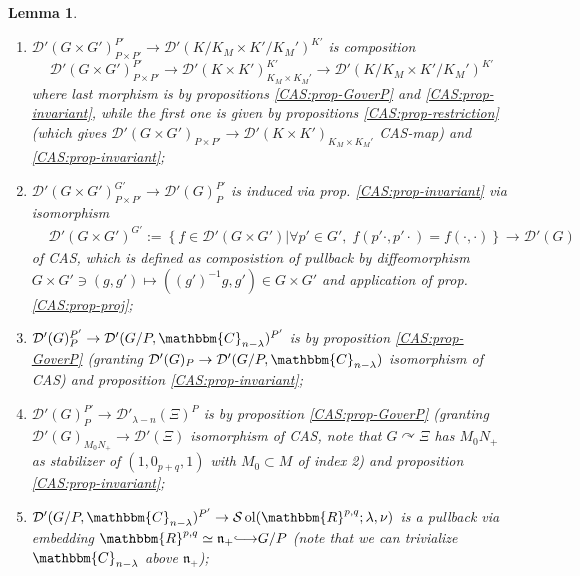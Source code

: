 \documentclass{article}
\newcommand{\assign}{:=}
\newcommand{\longhookrightarrow}{{\lhook\joinrel\relbar\joinrel\rightarrow}}
\newcommand{\tmop}[1]{\ensuremath{\operatorname{#1}}}
\newtheorem{lemma}{Lemma}
\begin{document}
\begin{lemma}
\begin{enumerate}
    \item $\mathcal{D}' (G \times G')_{P \times P'}^{P'} \rightarrow
    \mathcal{D}' (K / K_M \times K' / K_M')^{K'}$ is composition
    \[ \mathcal{D}' (G \times G')_{P \times P'}^{P'} \rightarrow \mathcal{D}'
       (K \times K')_{K_M \times K_M'}^{K'} \rightarrow \mathcal{D}' (K / K_M
       \times K' / K_M')^{K'} \]
    where last morphism is by propositions \ref{CAS:prop-GoverP} and
    \ref{CAS:prop-invariant}, while the first one is given by propositions
    \ref{CAS:prop-restriction} (which gives $\mathcal{D}' (G \times G')_{P
    \times P'} \rightarrow \mathcal{D}' (K \times K')_{K_M \times K_M'}$
    CAS-map) and \ref{CAS:prop-invariant};
    
    \item $\mathcal{D}' (G \times G')^{G'}_{P \times P'} \rightarrow
    \mathcal{D}' (G)_P^{P'}$ is induced via prop. \ref{CAS:prop-invariant} via
    isomorphism
    \begin{eqnarray}
      & \mathcal{D}' (G \times G')^{G'} \assign \left\{ f \in \mathcal{D}' (G
      \times G') \big| \forall p' \in G', \; f (p' \cdot, p' \cdot) = f
      (\cdot, \cdot) \right\} \rightarrow \mathcal{D}' (G) &  \nonumber
    \end{eqnarray}
    of CAS, which is defined as composistion of pullback by diffeomorphism $G
    \times G' \ni (g, g') \mapsto ((g')^{- 1} g, g') \in G \times G'$ and
    application of prop. \ref{CAS:prop-proj};
    
    \item $\mathcal{D}' (G)_P^{P'} \rightarrow \mathcal{D}' (G / P,
    \mathbbm{C}_{n - \lambda})^{P'}$ is by proposition \ref{CAS:prop-GoverP}
    (granting $\mathcal{D}' (G)_P \rightarrow \mathcal{D}' (G / P,
    \mathbbm{C}_{n - \lambda})$ isomorphism of CAS) and proposition
    \ref{CAS:prop-invariant};
    
    \item $\mathcal{D}' (G)_P^{P'} \rightarrow \mathcal{D}'_{\lambda - n}
    (\Xi)^P$ is by proposition \ref{CAS:prop-GoverP} (granting $\mathcal{D}'
    (G)_{M_0 N_+} \rightarrow \mathcal{D}' (\Xi)$ isomorphism of CAS, note
    that $G \curvearrowright \Xi$ has $M_0 N_+$ as stabilizer of $(1, 0_{p +
    q}, 1)$ with $M_0 \subset M$ of index 2) and proposition
    \ref{CAS:prop-invariant};
    
    \item $\mathcal{D}' (G / P, \mathbbm{C}_{n - \lambda})^{P'} \rightarrow
    \mathcal{S} \tmop{ol} (\mathbbm{R}^{p, q} ; \lambda, \nu)$ is a pullback
    via embedding $\mathbbm{R}^{p, q} \simeq \mathfrak{n}_+
    \longhookrightarrow G / P$ (note that we can trivialize $\mathbbm{C}_{n -
    \lambda}$ above $\mathfrak{n}_+$);
    

\end{enumerate}
\end{lemma}
\end{document}
